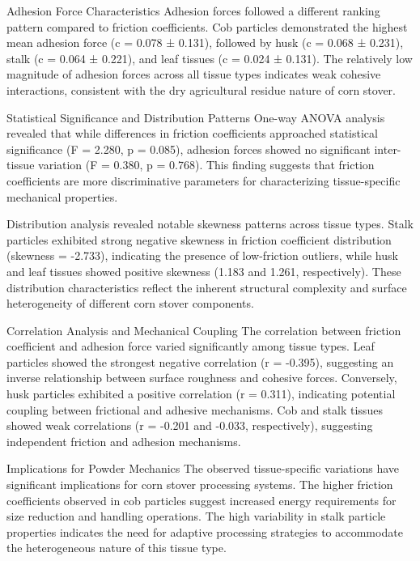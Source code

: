 \documentclass[xcolor=dvipsnames,10pt,hidelinks]{article}
\begin{document}
Adhesion Force Characteristics
Adhesion forces followed a different ranking pattern compared to friction coefficients. Cob particles demonstrated the highest mean adhesion force (c = 0.078 ± 0.131), followed by husk (c = 0.068 ± 0.231), stalk (c = 0.064 ± 0.221), and leaf tissues (c = 0.024 ± 0.131). The relatively low magnitude of adhesion forces across all tissue types indicates weak cohesive interactions, consistent with the dry agricultural residue nature of corn stover.

Statistical Significance and Distribution Patterns
One-way ANOVA analysis revealed that while differences in friction coefficients approached statistical significance (F = 2.280, p = 0.085), adhesion forces showed no significant inter-tissue variation (F = 0.380, p = 0.768). This finding suggests that friction coefficients are more discriminative parameters for characterizing tissue-specific mechanical properties.

Distribution analysis revealed notable skewness patterns across tissue types. Stalk particles exhibited strong negative skewness in friction coefficient distribution (skewness = -2.733), indicating the presence of low-friction outliers, while husk and leaf tissues showed positive skewness (1.183 and 1.261, respectively). These distribution characteristics reflect the inherent structural complexity and surface heterogeneity of different corn stover components.

Correlation Analysis and Mechanical Coupling
The correlation between friction coefficient and adhesion force varied significantly among tissue types. Leaf particles showed the strongest negative correlation (r = -0.395), suggesting an inverse relationship between surface roughness and cohesive forces. Conversely, husk particles exhibited a positive correlation (r = 0.311), indicating potential coupling between frictional and adhesive mechanisms. Cob and stalk tissues showed weak correlations (r = -0.201 and -0.033, respectively), suggesting independent friction and adhesion mechanisms.

Implications for Powder Mechanics
The observed tissue-specific variations have significant implications for corn stover processing systems. The higher friction coefficients observed in cob particles suggest increased energy requirements for size reduction and handling operations. The high variability in stalk particle properties indicates the need for adaptive processing strategies to accommodate the heterogeneous nature of this tissue type.
\end{document}
